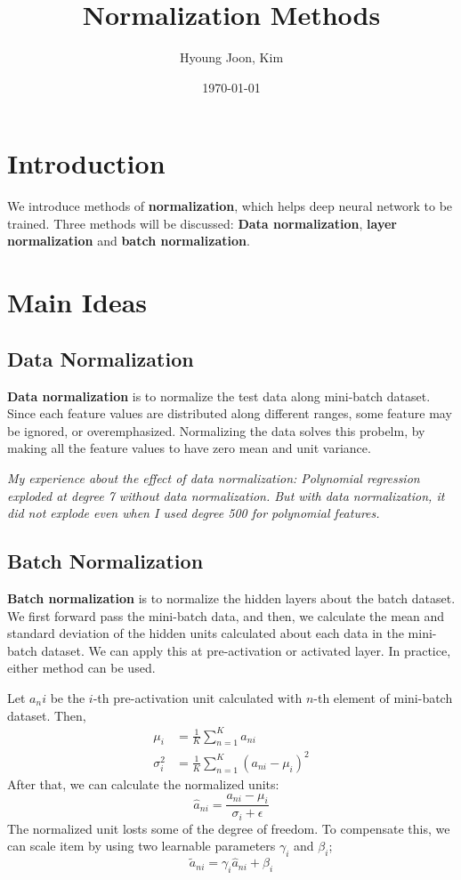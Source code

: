 \documentclass{article}
\title{Normalization Methods}
\author{Hyoung Joon, Kim}
\date{\today}
\begin{document}
\maketitle
\tableofcontents
\newpage

\section{Introduction}
    We introduce methods of \textbf{normalization}, which helps deep neural network to be trained.
    Three methods will be discussed: \textbf{Data normalization}, 
    \textbf{layer normalization} and \textbf{batch normalization}.

\section{Main Ideas}
    \subsection{Data Normalization}
        \textbf{Data normalization} is to normalize the test data along mini-batch dataset.
        Since each feature values are distributed along different ranges,
        some feature may be ignored, or overemphasized. Normalizing the data solves this probelm, by
        making all the feature values to have zero mean and unit variance.
        
        \emph{My experience about the effect of data normalization:
        Polynomial regression exploded at degree 7 without data normalization.
        But with data normalization, it did not explode even when I used degree 500 for polynomial features.}

    \subsection{Batch Normalization}\label{sec:batchNorm}
        \textbf{Batch normalization} is to normalize the hidden layers about the batch dataset.
        We first forward pass the mini-batch data, and then, we calculate the mean and standard
        deviation of the hidden units calculated about each data in the mini-batch dataset.
        We can apply this at pre-activation or activated layer. In practice, either method can be used.

        Let $a_ni$ be the $i$-th pre-activation unit calculated with $n$-th element of mini-batch dataset.
        Then,
        \begin{align}
            \mu_i &= \frac{1}{K}\sum_{n=1}^{K}a_{ni} \\
            \sigma_i^2 &= \frac{1}{K}\sum_{n=1}^{K}(a_{ni}-\mu_i)^2
        \end{align}
        After that, we can calculate the normalized units: 
        \[
        \hat{a}_{ni} = \frac{a_{ni}-\mu_i}{\sigma_i + \epsilon}
        \]
        The normalized unit losts some of the degree of freedom. To compensate this, we can scale item
        by using two learnable parameters $\gamma_i$ and $\beta_i$;
        \[
        \tilde{a}_{ni} = \gamma_i \hat{a}_{ni} + \beta_i
        \]
\end{document}
